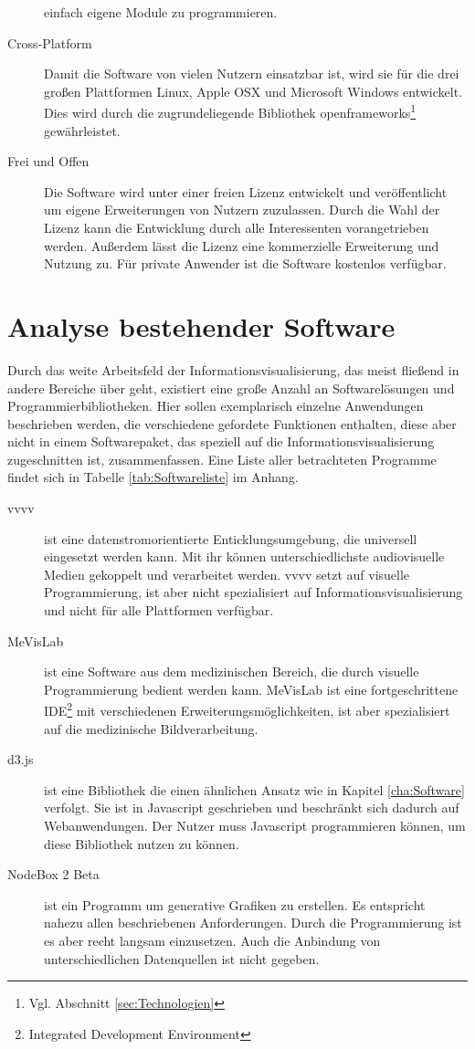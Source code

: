 \documentclass[a4paper, 12pt, DIVcalc, onepage, pdftex, headsepline, footsepline]{scrreprt}
\begin{document}
\begin{description}
einfach eigene Module zu programmieren.
\item[Cross-Platform]
Damit die Software von vielen Nutzern einsatzbar ist, wird sie für die
drei großen Plattformen Linux, Apple OSX und Microsoft Windows entwickelt.
Dies wird durch die zugrundeliegende Bibliothek
openframeworks\footnote{Vgl. Abschnitt \ref{sec:Technologien}} gewährleistet.
\item[Frei und Offen]
Die Software wird unter einer freien Lizenz entwickelt und veröffentlicht
um eigene Erweiterungen von Nutzern zuzulassen. Durch die Wahl der Lizenz kann
die Entwicklung durch alle Interessenten vorangetrieben werden. Außerdem lässt
die Lizenz eine kommerzielle Erweiterung und Nutzung zu. Für private Anwender
ist die Software kostenlos verfügbar.
\end{description}

\section{Analyse bestehender Software}
\label{sec:bestehendeSoftware}
Durch das weite Arbeitsfeld der Informationsvisualisierung, das meist
fließend in andere Bereiche über geht, existiert eine große Anzahl an
Softwarelösungen und Programmierbibliotheken. Hier sollen exemplarisch
einzelne Anwendungen beschrieben werden, die verschiedene gefordete
Funktionen enthalten, diese aber nicht in einem Softwarepaket, das
speziell auf die Informationsvisualisierung zugeschnitten ist, zusammenfassen.
Eine Liste aller betrachteten Programme findet sich in Tabelle
\ref{tab:Softwareliste} im Anhang.
\begin{description}
\item[vvvv]
ist eine datenstromorientierte Enticklungsumgebung, die universell eingesetzt werden kann.
Mit ihr können unterschiedlichste audiovisuelle Medien gekoppelt und
verarbeitet werden. vvvv setzt auf visuelle Programmierung, ist aber
nicht spezialisiert auf Informationsvisualisierung und nicht für alle
Plattformen verfügbar.
\item[MeVisLab]
ist eine Software aus dem medizinischen Bereich, die durch visuelle
Programmierung bedient werden kann. MeVisLab ist eine fortgeschrittene
IDE\footnote{Integrated Development Environment} mit verschiedenen
Erweiterungsmöglichkeiten, ist aber spezialisiert auf die medizinische
Bildverarbeitung.
\item[d3.js]
ist eine Bibliothek die einen ähnlichen Ansatz wie in Kapitel \ref{cha:Software}
verfolgt. Sie ist in Javascript geschrieben und beschränkt sich dadurch auf
Webanwendungen. Der Nutzer muss Javascript programmieren können, um diese
Bibliothek nutzen zu können.
\item[NodeBox 2 Beta]
ist ein Programm um generative Grafiken zu erstellen. Es entspricht nahezu
allen beschriebenen Anforderungen. Durch die Programmierung ist es aber recht
langsam einzusetzen. Auch die Anbindung von unterschiedlichen Datenquellen
ist nicht gegeben.
\end{description}
\end{document}
